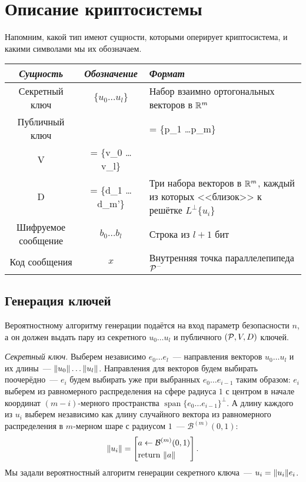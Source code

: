 \documentclass[oneside, a4paper]{article}
\theoremstyle{plain}
\theoremstyle{defn}
\theoremstyle{remark}
\DeclareMathOperator{\Span}{span}
\newcommand\PP{\ensuremath \mathcal P}
\newcommand\R{\ensuremath \mathbb R}
\DeclarePairedDelimiter\norm{\lVert}{\rVert}
\begin{document}
\section{Описание криптосистемы}

Напомним, какой тип имеют сущности, которыми оперирует криптосистема, и какими
символами мы их обозначаем.

\begin{table}[H]
\centering
\begin{tabular}{c | c | m{7cm}}
\emph{Сущность} & \emph{Обозначение} & \emph{Формат} \\
\hline
\hline
Секретный ключ & $\{u_0 \dots u_l\}$ & Набор взаимно ортогональных векторов в $\R^m$ \\
\hline
Публичный ключ
&
\parbox{3cm}{
\[
\begin{aligned}
\PP &= \{p_1 \dots p_m\} \\
V &= \{v_0 \dots v_l\} \\
D &= \{d_1 \dots d_{m'}\}
\end{aligned}
\]
}
& Три набора векторов в $\R^m$, каждый из которых <<близок>> к решётке $L^\bot
\{u_i\}$ \\
\hline
Шифруемое сообщение & $b_0 \dots b_l$ & Строка из $l+1$ бит \\
\hline
Код сообщения & $x$ & Внутренняя точка параллелепипеда $\PP^-$ \\
\end{tabular}
\end{table}

\subsection{Генерация ключей}
Вероятностному алгоритму генерации подаётся на вход параметр безопасности $n$, а
он должен выдать пару из секретного $u_0 \dots u_l$ и публичного $(\PP, V, D)$
ключей.

\emph{Секретный ключ.} Выберем независимо $e_0 \dots e_l$~--- направления
векторов $u_0 \dots u_l$ и их длины~--- $\norm{u_0} \dots \norm{u_l}$.
Направления для векторов будем выбирать поочерёдно~--- $e_i$ будем выбирать уже
при выбранных $e_0 \dots e_{i-1}$ таким образом: $e_i$ выберем из равномерного
распределения на сфере радиуса $1$ с центром в начале координат
$(m-i)$-мерного пространства $\Span \{e_0 \dots e_{i-1}\}^\bot$. А длину
каждого из $u_i$ выберем независимо как длину случайного вектора из равномерного
распределения в $m$-мерном шаре с радиусом $1$~--- $\mathcal B^{(m)}(0,1)$:
\[
\norm{u_i} =
\left [
\begin{aligned}
&a \gets \mathcal B^{(m)}(0,1) \\
&\text{return } \norm{a}
\end{aligned}
\right ].
\]
Мы задали вероятностный алгоритм генерации секретного ключа~--- $u_i = \norm{u_i}
e_i$.
\end{document}
